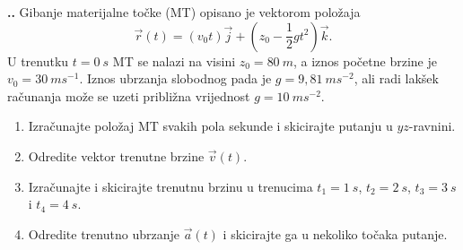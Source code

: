 
\noindent 
\textbf{
\thecjelina.\thezadatak.}
Gibanje materijalne točke (MT) opisano je vektorom položaja
$$
\vec{r}(t)=(v_0 t)\vec{j} +(z_0 -\frac{1}{2}gt^2)\vec{k}.
$$
U trenutku $t=0\ s$ MT se nalazi na visini $z_0=80\ m$, a iznos početne brzine je $v_0=30\ ms^{-1}$.
Iznos ubrzanja slobodnog pada je $g=9,81\ ms^{-2}$, ali radi lakšek računanja može se uzeti približna vrijednost $g=10\ ms^{-2}$.
\begin{enumerate}[label=\alph*)]
  \item Izračunajte položaj MT svakih pola sekunde i skicirajte putanju u $yz$-ravnini.
  \item  Odredite vektor trenutne brzine $\vec{v}(t)$.
  \item Izračunajte i skicirajte trenutnu brzinu u trenucima $t_1=1\ s$, $t_2=2\ s$, $t_3=3\ s$ i $t_4=4\ s$.
  \item Odredite trenutno ubrzanje $\vec{a}(t)$ i skicirajte ga u nekoliko točaka putanje.
\end{enumerate}
